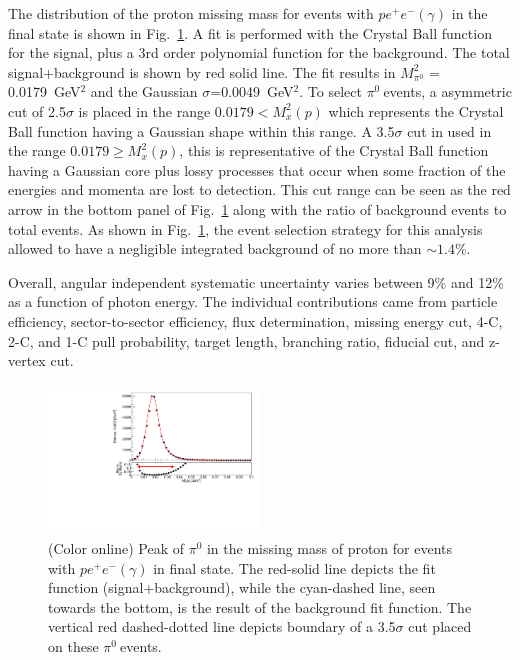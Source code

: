 \documentclass[aps,prc,twocolumn,floatfix,showpacs,preprintnumbers,amsmath,amssymb,superscriptaddress]{revtex4-1}
\def\pizT{$\pi^{0} \ $}
\begin{document}
The distribution of the proton missing mass for events
with $pe^+e^-(\gamma)$ in the final state is shown in 
Fig.~\ref{fig:pi0_peak}. A fit is performed with the Crystal Ball 
function~\cite{Ball1,Ball2} for the signal, plus a 3rd 
order polynomial function for the background. The total signal+background is shown by red solid line. The fit results in $M_{\pi^0}^2$ = 
0.0179~GeV$^2$ and the Gaussian $\sigma$=0.0049~GeV$^2$. To select \pizT events, 
a asymmetric cut of 2.5$\sigma$ is placed in the range $0.0179 <  M_x^2(p)$ which 
represents the Crystal Ball function having a Gaussian shape within this range.
A 3.5$\sigma$ cut in used in the range $0.0179 \geq  M_x^2(p)$, this is representative 
of the Crystal Ball function having a Gaussian core plus lossy processes that occur 
when some fraction of the energies and momenta are lost to detection. This cut 
range can be seen as the red arrow in the bottom panel of Fig.~\ref{fig:pi0_peak} along with the ratio of background events to total events.
As shown in Fig.~\ref{fig:pi0_peak}, the event selection strategy for this analysis allowed to have a negligible integrated background of no more than $\sim1.4\%$.

Overall, angular independent systematic uncertainty varies 
between 9\% and 12\% as a function of photon energy. The 
individual contributions came from particle efficiency, 
sector-to-sector efficiency, flux determination, missing energy cut, 
4-C, 2-C, and 1-C pull probability, target length, branching 
ratio, fiducial cut, and z-vertex cut.
\begin{figure}[htb!]
\centerline{
        \includegraphics[height=0.4\textwidth,width=0.5\textwidth]{G12_Pi0_wBck.pdf}}

        \caption {(Color online) Peak of $\pi^0$ in the missing
                mass of proton for events with $pe^+e^-(\gamma)$
                in final state. The red-solid line depicts the fit function (signal+background), while the cyan-dashed line, seen towards the bottom, is the result of the background fit function. The vertical red dashed-dotted line depicts boundary of a 3.5$\sigma$ cut placed on these \pizT events.} \label{fig:pi0_peak}
\end{figure}
\end{document}
